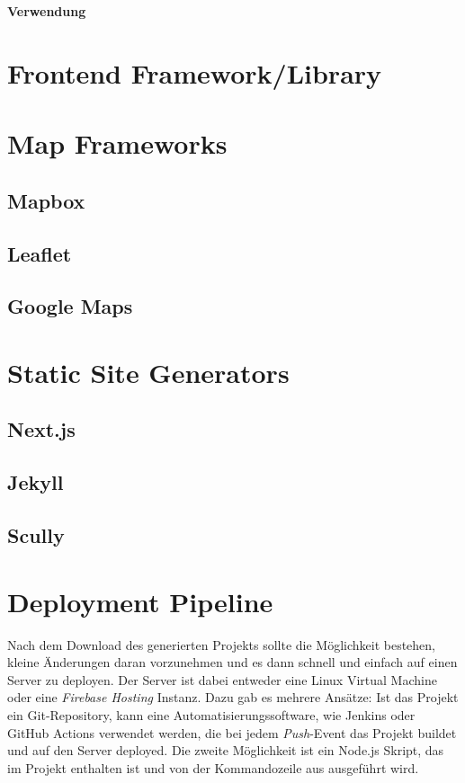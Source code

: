 \textbf{Verwendung}

\begin{center}
\end{center}

\section{Frontend Framework/Library}
\label{sec:frontend-framework/library}



\section{Map Frameworks}

\subsection{Mapbox}

\subsection{Leaflet}
\subsection{Google Maps}

\section{Static Site Generators}
\subsection{Next.js}
\subsection{Jekyll}
\subsection{Scully}

\section{Deployment Pipeline}
Nach dem Download des generierten Projekts sollte die Möglichkeit bestehen,
kleine Änderungen daran vorzunehmen und es dann schnell und einfach auf einen
Server zu deployen. Der Server ist dabei entweder eine Linux Virtual Machine
oder eine \textit{Firebase Hosting} Instanz.
Dazu gab es mehrere Ansätze: Ist das Projekt ein Git-Repository, kann eine
Automatisierungssoftware, wie Jenkins oder GitHub Actions verwendet werden,
die bei jedem \textit{Push}-Event das Projekt buildet und auf den Server
deployed. Die zweite Möglichkeit ist ein Node.js Skript, das im Projekt
enthalten ist und von der Kommandozeile aus ausgeführt wird.
